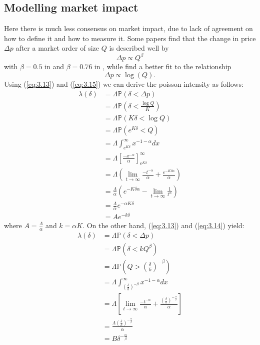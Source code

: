 \subsection*{Modelling market impact}

Here there is much less consensus on market impact, due to lack of
agreement on how to define it and how to measure it. Some papers
find that the change in price $\Delta p$ after a market order of size 
$Q$ is described well by 
\begin{equation}\label{eq:3.14}
    \Delta p\propto Q^\beta
\end{equation}
with $\beta=0.5$ in \cite{Gabaix2006} and $\beta=0.76$ in \cite{Weber2005},
while \cite{Potters2003} find a better fit to the relationship
\begin{equation}\label{eq:3.15}
    \Delta p\propto\log(Q).
\end{equation}
Using (\ref{eq:3.13}) and (\ref{eq:3.15}) we can derive the poisson 
intensity as follows:
\begin{align*}
    \lambda(\delta)&=\Lambda\mathbb{P}(\delta<\Delta p)\\
    &=\Lambda\mathbb{P}\left(\delta<\frac{\log Q}{K}\right)\\
    &=\Lambda\mathbb{P}(K\delta<\log Q)\\
    &=\Lambda\mathbb{P}\left(e^{K\delta}<Q\right)\\
    &=\Lambda\int_{e^{K\delta}}^{\infty}x^{-1-\alpha}dx\\
    &=\Lambda\left[\frac{-x^{-\alpha}}{\alpha}\right]_{e^{K\delta}}^\infty\\
    &=\Lambda\left(\lim_{t\rightarrow\infty}\frac{-t^{-\alpha}}{\alpha}+\frac{e^{-K\delta\alpha}}{\alpha}\right)\\
    &=\frac{\Lambda}{\alpha}\left(e^{-K\delta\alpha}-\lim_{t\rightarrow\infty}\frac{1}{t^\alpha}\right)\\
    &=\frac{\Lambda}{\alpha}e^{-\alpha K\delta}\\
    &=Ae^{-k\delta}
\end{align*}
where $A=\frac{\Lambda}{\alpha}$ and $k=\alpha K$. 
On the other hand, (\ref{eq:3.13}) and (\ref{eq:3.14}) yield:
\begin{align*}
    \lambda(\delta)&=\Lambda\mathbb{P}(\delta<\Delta p)\\
    &=\Lambda\mathbb{P}(\delta<kQ^\beta)\\
    &=\Lambda\mathbb{P}\left(Q>\left(\frac{\delta}{k}\right)^{-\beta}\right)\\
    &=\Lambda\int_{\left(\frac{\delta}{k}\right)^{-\beta}}^\infty x^{-1-\alpha}dx\\
    &=\Lambda\left[\lim_{t\rightarrow\infty}\frac{-t^{-\alpha}}{\alpha}+\frac{\left(\frac{\delta}{k}\right)^{-\frac{\alpha}{\beta}}}{\alpha}\right]\\
    &=\frac{\Lambda\left(\frac{\delta}{k}\right)^{-\frac{\alpha}{\beta}}}{\alpha}\\
    &=B\delta^{-\frac{\alpha}{\beta}}
\end{align*}
